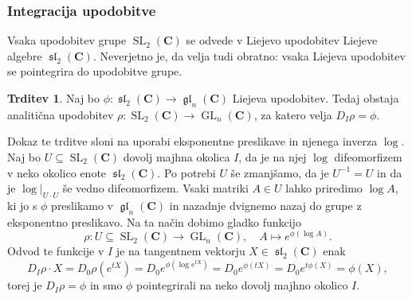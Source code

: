 \documentclass[11pt]{book}
\def\CC{\mathbf{C}}
\DeclareMathOperator\GL{GL}
\DeclareMathOperator\glfrak{\mathfrak{gl}}
\DeclareMathOperator\slfrak{\mathfrak{sl}}
\DeclareMathOperator\SL{SL}
\theoremstyle{definition}
\theoremstyle{zgled}
\theoremstyle{zgledbrezstevilke}
\theoremstyle{odprtproblem}
\theoremstyle{domacanaloga}
\theoremstyle{izrek}
\newtheorem{trditev}[theorem]{Trditev}
\begin{document}
\subsubsection{Integracija upodobitve}

Vsaka upodobitev grupe $\SL_2(\CC)$ se odvede v Liejevo upodobitev Liejeve algebre $\slfrak_2(\CC)$. Neverjetno je, da velja tudi obratno: vsaka Liejeva upodobitev se pointegrira do upodobitve grupe.

\begin{trditev}
Naj bo $\phi \colon \slfrak_2(\CC) \to \glfrak_n(\CC)$ Liejeva upodobitev. Tedaj obstaja analitična upodobitev $\rho \colon \SL_2(\CC) \to \GL_n(\CC)$, za katero velja $D_I \rho = \phi$.
\end{trditev}

Dokaz te trditve sloni na uporabi eksponentne preslikave in njenega inverza $\log$. Naj bo $U \subseteq \SL_2(\CC)$ dovolj majhna okolica $I$, da je na njej $\log$ difeomorfizem v neko okolico enote $\slfrak_2(\CC)$. Po potrebi $U$ še zmanjšamo, da je $U^{-1} = U$ in da je $\log |_{U \cdot U}$ še vedno difeomorfizem. Vsaki matriki $A \in U$ lahko priredimo $\log A$, ki jo s $\phi$ preslikamo v $\glfrak_n(\CC)$ in nazadnje dvignemo nazaj do grupe z eksponentno preslikavo. Na ta način dobimo gladko funkcijo
\[
    \textstyle \rho \colon U \subseteq \SL_2(\CC) \to \GL_n(\CC), \quad
    A \mapsto e^{\phi(\log A)}.
\]
Odvod te funkcije v $I$ je na tangentnem vektorju $X \in \slfrak_2(\CC)$ enak
\[
    \textstyle D_I \rho \cdot X
    = D_0 \rho(e^{tX})
    = D_0 e^{\phi(\log e^{tX})}
    = D_0 e^{\phi(tX)}
    = D_0 e^{t \phi(X)}
    = \phi(X),
\]
torej je $D_I \rho = \phi$ in smo $\phi$ pointegrirali na neko dovolj majhno okolico $I$. 
\end{document}
